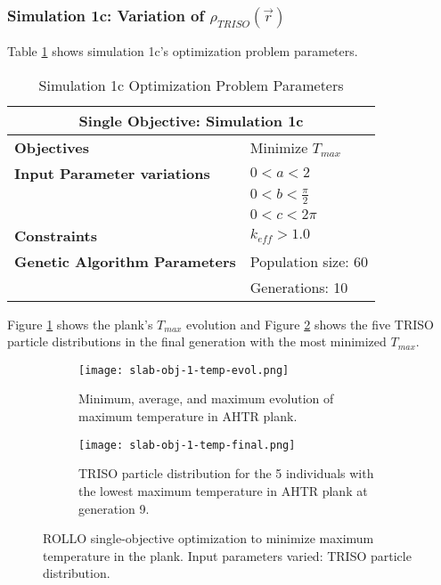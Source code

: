 \subsubsection{Simulation 1c: Variation of $\rho_{TRISO}(\vec{r})$}
Table \ref{tab:simulation1c} shows simulation 1c's optimization problem parameters. 
\begin{table}[H]
    \centering
    \onehalfspacing
    \caption{Simulation 1c Optimization Problem Parameters}
	\label{tab:simulation1c}
    \footnotesize
    \begin{tabular}{l|p{3cm}}
    \hline 
    \multicolumn{2}{c}{\textbf{Single Objective: Simulation 1c}} \\
    \hline 
    \textbf{Objectives} & Minimize $T_{max}$ \\
    \hline 
    \textbf{Input Parameter variations} & $0<a<2$ \\
    & $0<b<\frac{\pi}{2}$ \\
    & $0<c<2\pi$ \\
    \hline
    \textbf{Constraints} & $k_{eff} > 1.0$\\ 
    \hline 
    \textbf{Genetic Algorithm Parameters} & Population size: 60 \\
    & Generations: 10 \\
    \hline
    \end{tabular}
\end{table}
Figure \ref{fig:slab-obj-1-temp-evol} shows the plank's $T_{max}$ evolution 
and Figure \ref{fig:slab-obj-1-temp-final} shows the five TRISO particle 
distributions in the final generation with the most minimized $T_{max}$.
\begin{figure}[]
    \centering
    \begin{subfigure}{\textwidth}
        \texttt{[image: slab-obj-1-temp-evol.png]}
        \caption{Minimum, average, and maximum evolution of maximum temperature in 
        AHTR plank.}
        \label{fig:slab-obj-1-temp-evol} 
    \end{subfigure}
    \begin{subfigure}{\textwidth}
        \texttt{[image: slab-obj-1-temp-final.png]}
        \caption{TRISO particle distribution for the 5 individuals with the 
        lowest maximum temperature in AHTR plank at generation 9.}
        \label{fig:slab-obj-1-temp-final} 
    \end{subfigure}
    \caption{ROLLO single-objective optimization to minimize maximum temperature 
    in the plank. Input parameters varied: TRISO particle distribution.}
    \label{fig:slab-obj-1-temp}
\end{figure}
